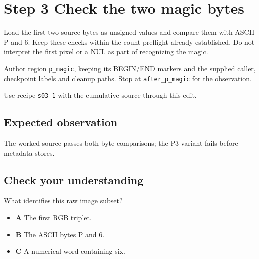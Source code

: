 \section{Step 3 Check the two magic bytes}\label{ppm-s03}

Load the first two source bytes as unsigned values and compare them with ASCII P and 6. Keep these checks within the count preflight already established. Do not interpret the first pixel or a NUL as part of recognizing the magic.

Author region \texttt{p\_magic}, keeping its BEGIN/END markers and the supplied caller, checkpoint labels and cleanup paths. Stop at \texttt{after\_p\_magic} for the observation.

Use recipe \texttt{s03-1} with the cumulative source through this edit.

\subsection{Expected observation}
The worked source passes both byte comparisons; the P3 variant fails before metadata stores.

\subsection{Check your understanding}
What identifies this raw image subset?

\begin{itemize}
  \item \textbf{A} The first RGB triplet.
  \item \textbf{B} The ASCII bytes P and 6.
  \item \textbf{C} A numerical word containing six.
\end{itemize}
